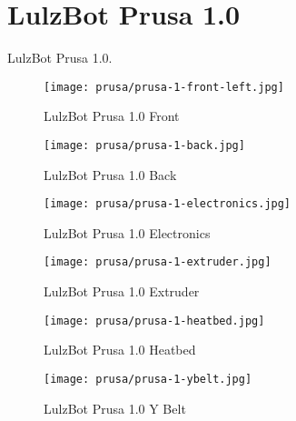 %
%
%
%
%

\section{LulzBot Prusa 1.0}
LulzBot Prusa 1.0.

\begin{figure}[h!]
\texttt{[image: prusa/prusa-1-front-left.jpg]}
 \caption{LulzBot Prusa 1.0 Front}
 \label{fig:prusa-1-front-left}
\end{figure}

\begin{figure}[h!]
\texttt{[image: prusa/prusa-1-back.jpg]}
 \caption{LulzBot Prusa 1.0 Back}
 \label{fig:prusa-1-back}
\end{figure}

\begin{figure}[h!]
\texttt{[image: prusa/prusa-1-electronics.jpg]}
 \caption{LulzBot Prusa 1.0 Electronics}
 \label{fig:prusa-1-electronics}
\end{figure}

\begin{figure}[h!]
\texttt{[image: prusa/prusa-1-extruder.jpg]}
 \caption{LulzBot Prusa 1.0 Extruder}
 \label{fig:prusa-1-extruder}
\end{figure}

\begin{figure}[h!]
\texttt{[image: prusa/prusa-1-heatbed.jpg]}
 \caption{LulzBot Prusa 1.0 Heatbed}
 \label{fig:prusa-1-heatbed}
\end{figure}

\begin{figure}[h!]
\texttt{[image: prusa/prusa-1-ybelt.jpg]}
 \caption{LulzBot Prusa 1.0 Y Belt}
 \label{fig:prusa-1-ybelt}
\end{figure}


